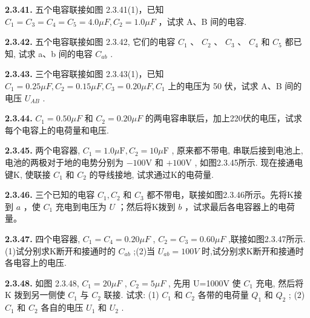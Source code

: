 \begin{center}
\end{center}

\vfill
\newpage

\textbf{2.3.41.} 五个电容联接如图 2.3.41(1)，已知 $C_{1}=C_{3}=C_{4}=C_{5}=4.0\mu F, C_{2}=1.0\mu F$ ，试求 A、B 间的电容.

\vfill
\newpage

\textbf{2.3.42.} 五个电容联接如图 2.3.42, 它们的电容 $C_{1}$ 、 $C_{2}$ 、 $C_{3}$ 、 $C_{4}$ 和 $C_{5}$ 都已知, 试求 a、b 间的电容 $C_{ab}$ .

\vfill
\newpage

\textbf{2.3.43.} 三个电容联接如图 2.3.43(1)，已知 $C_{1}=0.25\mu F, C_{2}=0.15\mu F, C_{3}=0.20\mu F, C_{1}$ 上的电压为 50 伏，试求 A、B 间的电压 $U_{AB}$ .

\begin{center}
\end{center}

\vfill
\newpage

\textbf{2.3.44.} $C_{1}=0.50\mu F$ 和 $C_{2}=0.20\mu F$ 的两电容串联后，加上220伏的电压，试求每个电容上的电荷量和电压.

\vfill
\newpage

\textbf{2.3.45.} 两个电容器, $C_1 = 1.0\mu \mathrm{F}, C_2 = 10\mu \mathrm{F}$ , 原来都不带电, 串联后接到电池上, 电池的两极对于地的电势分别为 $-100\mathrm{V}$ 和 $+100\mathrm{V}$ , 如图2.3.45所示. 现在接通电键K, 使联接 $C_1$ 和 $C_2$ 的导线接地, 试求通过K的电荷量.

\vfill
\newpage

\textbf{2.3.46.} 三个已知的电容 $C_1, C_2$ 和 $C_3$ 都不带电，联接如图2.3.46所示。先将K接到 $a$ ，使 $C_1$ 充电到电压为 $U$ ；然后将K拨到 $b$ ，试求最后各电容器上的电荷量。

\begin{center}
\end{center}

\vfill
\newpage

\textbf{2.3.47.} 四个电容器, $C_{1}=C_{4}=0.20\mu F$ , $C_{2}=C_{3}=0.60\mu F$ ,联接如图2.3.47所示.(1)试分别求K断开和接通时的 $C_{ab}$ ;(2)当 $U_{ab}=100V$ 时,试分别求K断开和接通时各电容上的电压.

\vfill
\newpage

\textbf{2.3.48.} 如图 2.3.48, $C_{1}=20\mu F$ , $C_{2}=5\mu F$ , 先用 U=1000V 使 $C_{1}$ 充电, 然后将 K 拨到另一侧使 $C_{1}$ 与 $C_{2}$ 联接. 试求: (1) $C_{1}$ 和 $C_{2}$ 各带的电荷量 $Q_{1}$ 和 $Q_{2}$ ; (2) $C_{1}$ 和 $C_{2}$ 各自的电压 $U_{1}$ 和 $U_{2}$ .

